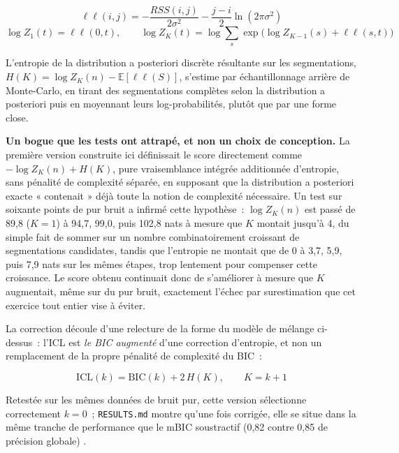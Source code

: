 \documentclass[11pt]{article}
\newcommand{\code}[1]{\texttt{#1}}
\begin{document}
\begin{equation}
\ell\ell(i, j) = -\frac{RSS(i, j)}{2\sigma^2} - \frac{j - i}{2} \ln(2\pi\sigma^2)
\end{equation}
\begin{equation}
\log Z_1(t) = \ell\ell(0, t), \qquad \log Z_K(t) = \log \sum_{s} \exp\!\Big( \log Z_{K-1}(s) + \ell\ell(s, t) \Big)
\end{equation}

L'entropie de la distribution a posteriori discrète résultante sur les
segmentations, $H(K) = \log Z_K(n) - \mathbb{E}[\ell\ell(S)]$, s'estime par
échantillonnage arrière de Monte-Carlo, en tirant des segmentations
complètes selon la distribution a posteriori puis en moyennant leurs
log-probabilités, plutôt que par une forme close.

\textbf{Un bogue que les tests ont attrapé, et non un choix de conception.}
La première version construite ici définissait le score directement comme
$-\log Z_K(n) + H(K)$, pure vraisemblance intégrée additionnée d'entropie,
sans pénalité de complexité séparée, en supposant que la distribution a
posteriori exacte « contenait » déjà toute la notion de complexité
nécessaire. Un test sur soixante points de pur bruit a infirmé cette
hypothèse~: $\log Z_K(n)$ est passé de 89,8 ($K=1$) à 94,7, 99,0, puis
102,8 nats à mesure que $K$ montait jusqu'à 4, du simple fait de sommer sur
un nombre combinatoirement croissant de segmentations candidates, tandis
que l'entropie ne montait que de 0 à 3,7, 5,9, puis 7,9 nats sur les mêmes
étapes, trop lentement pour compenser cette croissance. Le score obtenu
continuait donc de s'améliorer à mesure que $K$ augmentait, même sur du pur
bruit, exactement l'échec par surestimation que cet exercice tout entier
vise à éviter.

La correction découle d'une relecture de la forme du modèle de mélange
ci-dessus~: l'ICL est \emph{le BIC augmenté} d'une correction d'entropie,
et non un remplacement de la propre pénalité de complexité du BIC~:

\begin{equation}
\mathrm{ICL}(k) = \mathrm{BIC}(k) + 2\,H(K), \qquad K = k+1
\end{equation}

Retestée sur les mêmes données de bruit pur, cette version sélectionne
correctement $k = 0$~; \code{RESULTS.md} montre qu'une fois corrigée, elle
se situe dans la même tranche de performance que le mBIC soustractif (0,82
contre 0,85 de précision globale) \citep{biernacki2000}.
\end{document}
